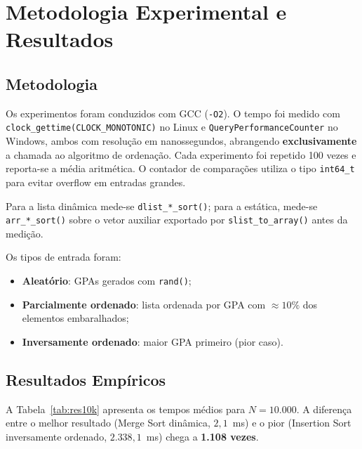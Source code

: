 \documentclass[conference]{IEEEtran}
\begin{document}
\section{Metodologia Experimental e Resultados}
\label{sec:resultados}

\subsection{Metodologia}

Os experimentos foram conduzidos com GCC (\texttt{-O2}). O tempo foi medido
com \texttt{clock\_gettime(CLOCK\_MONO\-TONIC)} no Linux e
\texttt{QueryPerformanceCounter} no Windows, ambos com resolução em
nanossegundos, abrangendo \textbf{exclusivamente} a chamada ao algoritmo
de ordenação. Cada experimento foi repetido 100 vezes e reporta-se a
média aritmética. O contador de comparações utiliza o tipo \texttt{int64\_t}
para evitar overflow em entradas grandes.

Para a lista dinâmica mede-se \texttt{dlist\_*\_sort()}; para a estática,
mede-se \texttt{arr\_*\_sort()} sobre o vetor auxiliar exportado por
\texttt{slist\_to\_array()} antes da medição.

Os tipos de entrada foram:
\begin{itemize}[leftmargin=*,itemsep=1pt]
  \item \textbf{Aleatório}: GPAs gerados com \texttt{rand()};
  \item \textbf{Parcialmente ordenado}: lista ordenada por GPA com
        $\approx10\%$ dos elementos embaralhados;
  \item \textbf{Inversamente ordenado}: maior GPA primeiro (pior caso).
\end{itemize}

\subsection{Resultados Empíricos}

A Tabela~\ref{tab:res10k} apresenta os tempos médios para $N = 10{.}000$.
A diferença entre o melhor resultado (Merge Sort dinâmica, $2{,}1$~ms) e
o pior (Insertion Sort inversamente ordenado, $2{.}338{,}1$~ms) chega a
\textbf{1.108 vezes}.
\end{document}

